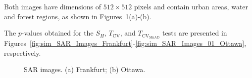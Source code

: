 \documentclass[remotesensing,article,submit,moreauthors,pdftex]{Definitions/mdpi}
\begin{document}
Both images have dimensions of \(512 \times 512\) pixels and contain
urban areas, water and forest regions, as shown in
Figures~\ref{fig:real_SAR_Images_coe}(a)-(b).

The \(p\)-values obtained for the \(S_H\), \(T_{\text{CV}}\), and
\(T_{\text{CV}_{\text{MnAD}}}\) tests are presented in
Figures~\ref{fig:sim_SAR_Images_Frankfurt}-\ref{fig:sim_SAR_Images_01_Ottawa},
respectively.

\begin{figure}[H]

{\centering {}

}

\caption{SAR images. (a) Frankfurt; (b) Ottawa. }\label{fig:real_SAR_Images_coe}
\end{figure}
\end{document}

